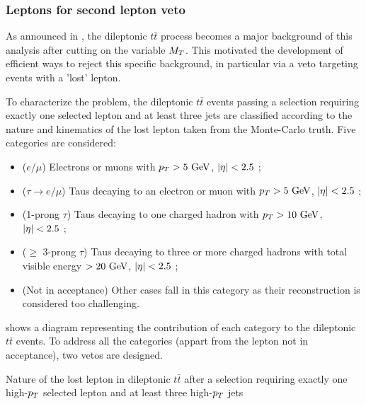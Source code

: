         \subsubsection{Leptons for second lepton veto \label{sec:vetoLeptons}}

    As announced in , the dileptonic $t\bar{t}$
    process becomes a major background of this analysis after cutting on the variable $M_T$.
    This motivated the development of efficient ways to reject this specific background,
    in particular via a veto targeting events with a 'lost' lepton.

    To characterize the problem, the dileptonic $t\bar{t}$ events passing a selection
    requiring exactly one selected lepton and at least three jets are classified according
    to the nature and kinematics of the lost lepton taken from the Monte-Carlo truth. Five
    categories are considered:
    \begin{itemize}
        \item ($e/\mu$) Electrons or muons with $p_T > 5~\text{GeV}$, $\left| \eta \right| < 2.5$ ;
        \item ($\tau \rightarrow e/\mu$) Taus decaying to an electron or muon with $p_T > 5~\text{GeV}$, $\left| \eta \right| < 2.5$ ;
        \item (1-prong $\tau$) Taus decaying to one charged hadron with $p_T > 10~\text{GeV}$, $\left| \eta \right| < 2.5$ ;
        \item ($\geq$ 3-prong $\tau$) Taus decaying to three or more charged hadrons
              with total visible energy $> 20~\text{GeV}$, $\left| \eta \right| < 2.5$ ;
        \item (Not in acceptance) Other cases fall in this category as their reconstruction
              is considered too challenging.
    \end{itemize}

     shows a diagram representing
    the contribution of each category to the dileptonic $t\bar{t}$ events. To address all
    the categories (appart from the lepton not in acceptance), two vetos are designed.

                 {Nature of the lost lepton in dileptonic $t\bar{t}$ after a selection
                 requiring exactly one high-$p_T$ selected lepton and at least three
                 high-$p_T$ jets}

